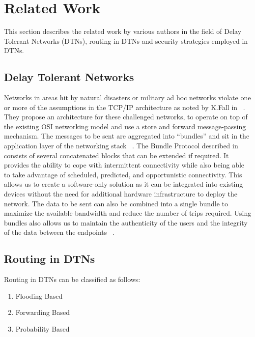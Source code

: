 \chapter{Related Work\label{chap:blah}}
This section describes the related work by various authors in the field of Delay Tolerant Networks (DTNs), routing in DTNs and security strategies employed in DTNs.

\section{Delay Tolerant Networks}

Networks in areas hit by natural disasters or military ad hoc networks violate one or more of the assumptions in the TCP/IP architecture as noted by K.Fall in ~\cite{rw1}. They propose an architecture for these challenged networks, to operate on top of the existing OSI networking model and use a store and forward message-passing mechanism. The messages to be sent are aggregated into “bundles” and sit in the application layer of the networking stack ~\cite{rw2}. The Bundle Protocol described in ~\cite{rw3} consists of several concatenated blocks that can be extended if required. It provides the ability to cope with intermittent connectivity while also being able to take advantage of scheduled, predicted, and opportunistic connectivity. This allows us to create a software-only solution as it can be integrated into existing devices without the need for additional hardware infrastructure to deploy the network. The data to be sent can also be combined into a single bundle to maximize the available bandwidth and reduce the number of trips required. Using bundles also allows us to maintain the authenticity of the users and the integrity of the data between the endpoints ~\cite{rw4}.

\section{Routing in DTNs}

Routing in DTNs can be classified as follows:
\begin{enumerate}[label=(\roman*)]
\item Flooding Based
\item Forwarding Based
\item Probability Based
\end{enumerate}

